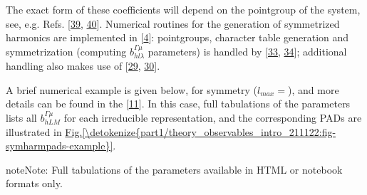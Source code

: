 \documentclass[letterpaper,table,10pt,english]{jupyterBook}
\begin{document}
\sphinxAtStartPar
The exact form of these coefficients will depend on the point\sphinxhyphen{}group of the system, see, e.g. Refs. {[}\hyperlink{cite.backmatter/bibliography:id459}{39}, \hyperlink{cite.backmatter/bibliography:id696}{40}{]}. Numerical routines for the generation of symmetrized harmonics are implemented in  {[}\hyperlink{cite.backmatter/bibliography:id574}{4}{]}: point\sphinxhyphen{}groups, character table generation and symmetrization (computing \(b_{hl\lambda}^{\Gamma\mu}\) parameters) is handled by  {[}\hyperlink{cite.backmatter/bibliography:id593}{33}, \hyperlink{cite.backmatter/bibliography:id594}{34}{]}; additional handling also makes use of  {[}\hyperlink{cite.backmatter/bibliography:id800}{29}, \hyperlink{cite.backmatter/bibliography:id740}{30}{]}.

\sphinxAtStartPar
A brief numerical example is given below, for  symmetry (\(l_{max}=\)), and more details can be found in the  {[}\hyperlink{cite.backmatter/bibliography:id573}{11}{]}. In this case, full tabulations of the parameters lists all \(b_{hLM}^{\Gamma\mu}\) for each irreducible representation, and the corresponding PADs are illustrated in \hyperref[\detokenize{part1/theory_observables_intro_211122:fig-symharmpads-example}]{Fig.\@ \ref{\detokenize{part1/theory_observables_intro_211122:fig-symharmpads-example}}}.

\begin{sphinxShadowBox}
\sphinxstylesidebartitle{}

\begin{sphinxadmonition}{note}{Note:}
\sphinxAtStartPar
Full tabulations of the parameters available in HTML or notebook formats only.
\end{sphinxadmonition}
\end{sphinxShadowBox}
\end{document}
